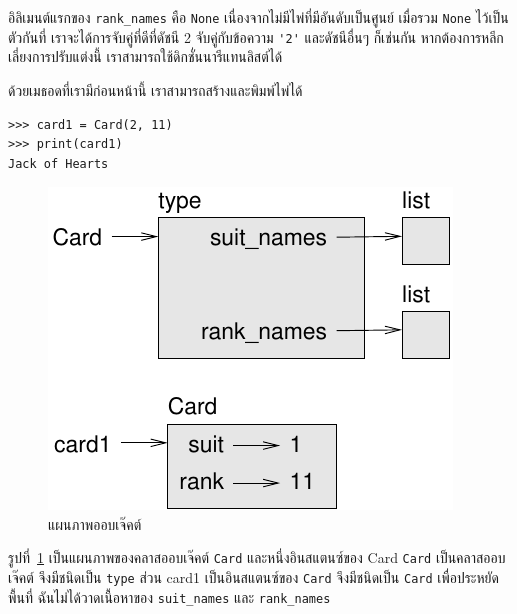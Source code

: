 อิลิเมนต์แรกของ \verb"rank_names" คือ {\tt None} เนื่องจากไม่มีไพ่ที่มีอันดับเป็นศูนย์ เมื่อรวม {\tt None} ไว้เป็นตัวกันที่ 
เราจะได้การจับคู่ที่ดีที่ดัชนี 2 จับคู่กับข้อความ \verb"'2'" และดัชนีอื่นๆ ก็เช่นกัน หากต้องการหลีกเลี่ยงการปรับแต่งนี้ เราสามารถใช้ดิกชั่นนารีแทนลิสต์ได้



ด้วยเมธอดที่เรามีก่อนหน้านี้ เราสามารถสร้างและพิมพ์ไพ่ได้

\begin{verbatim}
>>> card1 = Card(2, 11)
>>> print(card1)
Jack of Hearts
\end{verbatim}

\begin{figure}
\centerline
{\includegraphics[scale=0.8]{figs/card1.pdf}}
\caption{แผนภาพออบเจ๊คต์}
\label{fig.card1}
\end{figure}


รูปที่~\ref{fig.card1} เป็นแผนภาพของคลาสออบเจ๊คต์ {\tt Card} และหนึ่งอินสแตนซ์ของ Card 
{\tt Card} เป็นคลาสออบเจ๊คต์  จึงมีชนิดเป็น {\tt type} 
ส่วน card1 เป็นอินสแตนซ์ของ {\tt Card} จึงมีชนิดเป็น {\tt Card} 
เพื่อประหยัดพื้นที่ ฉันไม่ได้วาดเนื้อหาของ \verb"suit_names" และ \verb"rank_names"


